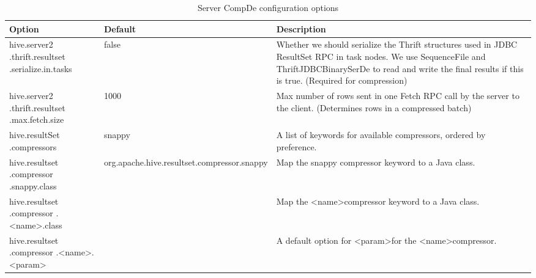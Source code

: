 \documentclass[11pt,a4paper]{article}
\begin{document}
		\begin{table}[H]
			\begin{tabular}{| p{2.7cm} | p{1.9cm} | p{6.4cm} |} \hline
				
				\textbf{Option} & \textbf{Default} & \textbf{Description} \\ \hline
				
				hive.server2\linebreak
				.thrift.resultset\linebreak
				.serialize.in.tasks
				& false
				& Whether we should serialize the Thrift structures used in JDBC ResultSet RPC in task nodes.\linebreak
				We use SequenceFile and ThriftJDBCBinarySerDe to read and write the final results if this is true.\linebreak
				(Required for compression)
				\\ \hline
				
				hive.server2\linebreak
				.thrift.resultset\linebreak
				.max.fetch.size
				& 1000
				& Max number of rows sent in one Fetch RPC call by the server to the client.\linebreak
				(Determines rows in a compressed batch)
				\\ \hline
				
				hive.resultSet\linebreak
				.compressors
				& snappy
				& A list of keywords for available compressors, ordered by preference.
				\\ \hline
				
				hive.resultset\linebreak
				.compressor\linebreak
				.snappy.class
				& org.apache\linebreak.hive\linebreak.resultset\linebreak.compressor\linebreak.snappy
				& Map the snappy compressor keyword to a Java class.
				\\ \hline
				
				hive.resultset\linebreak
				.compressor\linebreak
				.\textless name\textgreater .class
				&
				& Map the \textless name\textgreater\space compressor keyword to a Java class.
				\\ \hline
				
				hive.resultset\linebreak
				.compressor\linebreak
				.\textless name\textgreater\linebreak.\textless param\textgreater
				&
				& A default option for \textless param\textgreater\space for the \textless name\textgreater\space compressor. 
				\\ \hline
				
			\end{tabular}
			\caption{Server CompDe configuration options}
		\end{table}
		
\end{document}

